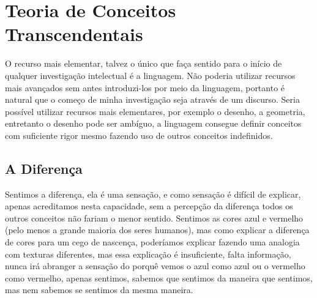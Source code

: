 \documentclass[10pt,a4paper]{report}
\begin{document}
\chapter{Teoria de Conceitos Transcendentais}

\hspace{\baselineskip}

O recurso mais elementar, talvez o único que faça sentido para o início de qualquer investigação intelectual é a linguagem. Não poderia utilizar recursos mais avançados sem antes introduzi-los por meio da linguagem, portanto é natural que o começo de minha investigação seja através de um discurso. Seria possível utilizar recursos mais elementares, por exemplo o desenho, a geometria, entretanto o desenho pode ser ambíguo, a linguagem consegue definir conceitos com suficiente rigor mesmo fazendo uso de outros conceitos indefinidos.


\section{A Diferença}

\hspace{\baselineskip}

Sentimos a diferença, ela é uma sensação, e como sensação é difícil de explicar, apenas acreditamos nesta capacidade, sem a percepção da diferença todos os outros conceitos não fariam o menor sentido. Sentimos as cores azul e vermelho (pelo menos a grande maioria dos seres humanos), mas como explicar a diferença de cores para um cego de nascença, poderíamos explicar fazendo uma analogia com texturas diferentes, mas essa explicação é insuficiente, falta informação, nunca irá abranger a sensação do porquê vemos o azul como azul ou o vermelho como vermelho, apenas sentimos, sabemos que sentimos da maneira que sentimos, mas nem sabemos se sentimos da mesma maneira. 


\hspace{\baselineskip}
\end{document}
